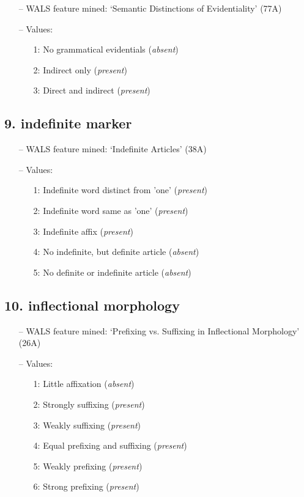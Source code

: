 \begin{itemize}
\item[--] WALS feature mined: `Semantic Distinctions of Evidentiality' (77A)
\item[--] Values:

\begin{enumerate}
\item[1:] No grammatical evidentials (\emph{absent})
\item[2:] Indirect only (\emph{present})
\item[3:] Direct and indirect (\emph{present})
\end{enumerate}
\end{itemize}

\subsection*{9. indefinite marker}

\begin{itemize}
\item[--] WALS feature mined: `Indefinite Articles' (38A)
\item[--] Values:

\begin{enumerate}
\item[1:] Indefinite word distinct from 'one' (\emph{present})
\item[2:] Indefinite word same as 'one' (\emph{present})
\item[3:] Indefinite affix (\emph{present})
\item[4:] No indefinite, but definite article (\emph{absent})
\item[5:] No definite or indefinite article (\emph{absent})
\end{enumerate}
\end{itemize}

\subsection*{10. inflectional morphology}

\begin{itemize}
\item[--] WALS feature mined: `Prefixing vs. Suffixing in Inflectional Morphology' (26A)
\item[--] Values:

\begin{enumerate}
\item[1:] Little affixation (\emph{absent})
\item[2:] Strongly suffixing (\emph{present})
\item[3:] Weakly suffixing (\emph{present})
\item[4:] Equal prefixing and suffixing (\emph{present})
\item[5:] Weakly prefixing (\emph{present})
\item[6:] Strong prefixing (\emph{present})
\end{enumerate}
\end{itemize}

